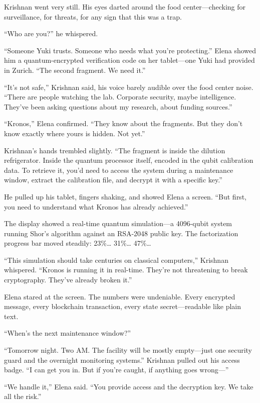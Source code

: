\documentclass[12pt,letterpaper]{book}
\begin{document}
Krishnan went very still. His eyes darted around the food center---checking for surveillance, for threats, for any sign that this was a trap.

``Who are you?'' he whispered.

``Someone Yuki trusts. Someone who needs what you're protecting.'' Elena showed him a quantum-encrypted verification code on her tablet---one Yuki had provided in Zurich. ``The second fragment. We need it.''

``It's not safe,'' Krishnan said, his voice barely audible over the food center noise. ``There are people watching the lab. Corporate security, maybe intelligence. They've been asking questions about my research, about funding sources.''

``Kronos,'' Elena confirmed. ``They know about the fragments. But they don't know exactly where yours is hidden. Not yet.''

Krishnan's hands trembled slightly. ``The fragment is inside the dilution refrigerator. Inside the quantum processor itself, encoded in the qubit calibration data. To retrieve it, you'd need to access the system during a maintenance window, extract the calibration file, and decrypt it with a specific key.''

He pulled up his tablet, fingers shaking, and showed Elena a screen. ``But first, you need to understand what Kronos has already achieved.''

The display showed a real-time quantum simulation---a 4096-qubit system running Shor's algorithm against an RSA-2048 public key. The factorization progress bar moved steadily: 23\%\ldots{} 31\%\ldots{} 47\%\ldots{}

``This simulation should take centuries on classical computers,'' Krishnan whispered. ``Kronos is running it in real-time. They're not threatening to break cryptography. They've already broken it.''

Elena stared at the screen. The numbers were undeniable. Every encrypted message, every blockchain transaction, every state secret---readable like plain text.

``When's the next maintenance window?''

``Tomorrow night. Two AM. The facility will be mostly empty---just one security guard and the overnight monitoring systems.'' Krishnan pulled out his access badge. ``I can get you in. But if you're caught, if anything goes wrong---''

``We handle it,'' Elena said. ``You provide access and the decryption key. We take all the risk.''
\end{document}

